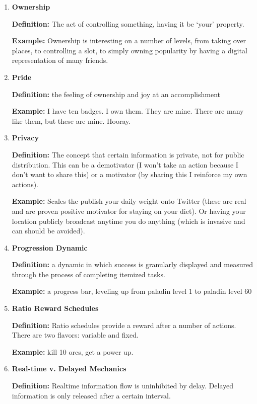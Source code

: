 \begin{enumerate}
\item \textbf{Ownership}

\textbf{Definition:} The act of controlling something, having it be `your' property.

\textbf{Example:} Ownership is interesting on a number of levels, from taking over places, to controlling a slot, to simply owning popularity by having a digital representation of many friends.

\item \textbf{Pride}

\textbf{Definition:} the feeling of ownership and joy at an accomplishment

\textbf{Example:} I have ten badges. I own them. They are mine. There are many like them, but these are mine. Hooray.

\item \textbf{Privacy}

\textbf{Definition:} The concept that certain information is private, not for public distribution. This can be a demotivator (I won’t take an action because I don’t want to share this) or a motivator (by sharing this I reinforce my own actions).

\textbf{Example:} Scales the publish your daily weight onto Twitter (these are real and are proven positive motivator for staying on your diet). Or having your location publicly broadcast anytime you do anything (which is invasive and can should be avoided).

\item \textbf{Progression Dynamic}

\textbf{Definition:} a dynamic in which success is granularly displayed and measured through the process of completing itemized tasks.

\textbf{Example:} a progress bar, leveling up from paladin level 1 to paladin level 60

\item \textbf{Ratio Reward Schedules}

\textbf{Definition:} Ratio schedules provide a reward after a number of actions. There are two flavors: variable and fixed.

\textbf{Example:} kill 10 orcs, get a power up.

\item \textbf{Real-time v. Delayed Mechanics}

\textbf{Definition:} Realtime information flow is uninhibited by delay. Delayed information is only released after a certain interval.


\end{enumerate}
